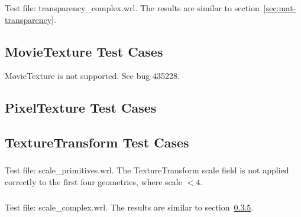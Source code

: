 \subsubsection{\MatAC}
Test file: transparency\_complex.wrl.\newline
The results are similar to section~\ref{sec:mat-transparency}.

\subsection{MovieTexture Test Cases}
MovieTexture is not supported.
See bug 435228.

\subsection{PixelTexture Test Cases}

\subsection{TextureTransform Test Cases}

\subsubsection{\TTA}
\subsubsection{\TTBa\TTBb}
\subsubsection{\TTCa\TTCb}
\subsubsection{\TTDa\TTDb}
\subsubsection{\TTEa\TTEb}
\label{sec:scale}
Test file: scale\_primitives.wrl.\newline
The TextureTransform scale field is not applied correctly to
the first four geometries, where scale $< 4$.

\subsubsection{\TTFa\TTFb}
Test file: scale\_complex.wrl.\newline
The results are similar to section~\ref{sec:scale}.

